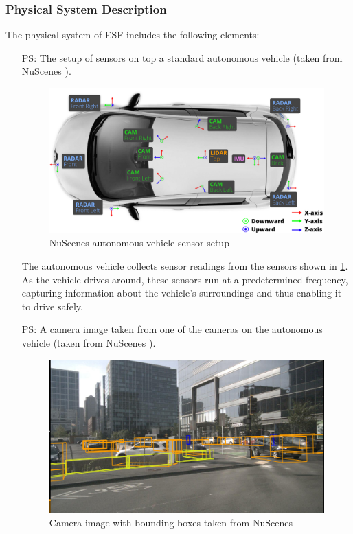\documentclass[12pt]{article}
\newcounter{psysnum} %
\newcommand{\ProjectName}{ESF }
\begin{document}
\subsubsection{Physical System Description} \label{sec_phySystDescrip}

The physical system of \ProjectName includes the following elements:

\begin{itemize}

\item [PS\refstepcounter{psysnum}\thepsysnum \label{Autonomous Vehicle}:] The setup of sensors on top a standard autonomous vehicle (taken from NuScenes \cite{caesar2020nuscenes}). 
\begin{figure}[H]
  \centering
  \includegraphics[width=15cm]{NuScenes_Vehicle.png}
  \caption{NuScenes autonomous vehicle sensor setup}\label{fig:AutoVehicle}
\end{figure}

The autonomous vehicle collects sensor readings from the sensors shown in \ref{fig:AutoVehicle}. As the vehicle drives around, these sensors 
run at a predetermined frequency, capturing information about the vehicle's surroundings and thus enabling it to drive safely.

\item [PS\refstepcounter{psysnum}\thepsysnum \label{Camera Images}:] A camera image taken from one of the cameras on the autonomous vehicle (taken from NuScenes \cite{caesar2020nuscenes}).
\begin{figure}[H]
  \centering
  \includegraphics[width=15cm]{Camera_View.png}
  \caption{Camera image with bounding boxes taken from NuScenes}\label{fig:CameraView}
\end{figure}


\end{itemize}
\end{document}

